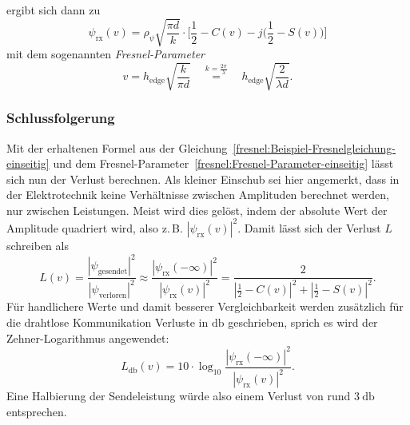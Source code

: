 ergibt sich dann zu
\begin{equation}
    \psi_{\text{rx}} (v)
    =
    \rho_{\psi} \sqrt{\frac{\pi d}{k}} \cdot \biggl[\frac{1}{2} - C(v) -j\biggl(\frac{1}{2}-S(v)\biggr)\biggr]
    \label{fresnel:Beispiel-Fresnelgleichung-einseitig}
\end{equation}
mit dem sogenannten \emph{Fresnel-Parameter}
%
\begin{equation}
    v
    =
    h_{\text{edge}} \sqrt{\frac{k}{\pi d}}
    \quad
    \overset{k = \frac{2 \pi}{\lambda}}{=}
    \quad
    h_{\text{edge}} \sqrt{\frac{2}{\lambda d}}.
    \label{fresnel:Fresnel-Parameter-einseitig}
\end{equation}

\subsubsection{Schlussfolgerung}
Mit der erhaltenen Formel aus der Gleichung~\eqref{fresnel:Beispiel-Fresnelgleichung-einseitig}
und dem Fresnel-Parameter~\eqref{fresnel:Fresnel-Parameter-einseitig}
lässt sich nun der Verlust berechnen.
%
Als kleiner Einschub sei hier angemerkt,
dass in der Elektrotechnik keine Verhältnisse
%
zwischen Amplituden berechnet werden,
nur zwischen Leistungen.
Meist wird dies gelöst,
indem der absolute Wert der Amplitude quadriert wird,
also z.\,B. $|\psi_{\text{rx}} (v)|^2$.
Damit lässt sich der Verlust $L$ schreiben als
\begin{equation}
    L(v)
    =
    \frac{|\psi_{\text{gesendet}}|^2}{|\psi_{\text{verloren}}|^2}
    \approx
    \frac{|\psi_{\text{rx}} (-\infty)|^2}{|\psi_{\text{rx}} (v)|^2}
    =
    \frac{2}{\left|\frac{1}{2}-C(v)\right|^2 + \left|\frac{1}{2}-S(v)\right|^2}.
    \label{fresnel:Beispiel-diff-loss-einseitig}
\end{equation}
Für handlichere Werte und damit besserer Vergleichbarkeit
werden zusätzlich für die drahtlose Kommunikation Verluste in $\unit{\decibel}$
%
geschrieben, sprich es wird der Zehner-Logarithmus angewendet:
\[
L_{\unit{\decibel}} (v)
=
10 \cdot \log_{10} \frac{|\psi_{\text{rx}} (-\infty)|^2}{|\psi_{\text{rx}} (v)|^2}.
\]
Eine Halbierung der Sendeleistung würde also einem Verlust von
rund $\qty{3}{\decibel}$ entsprechen.

